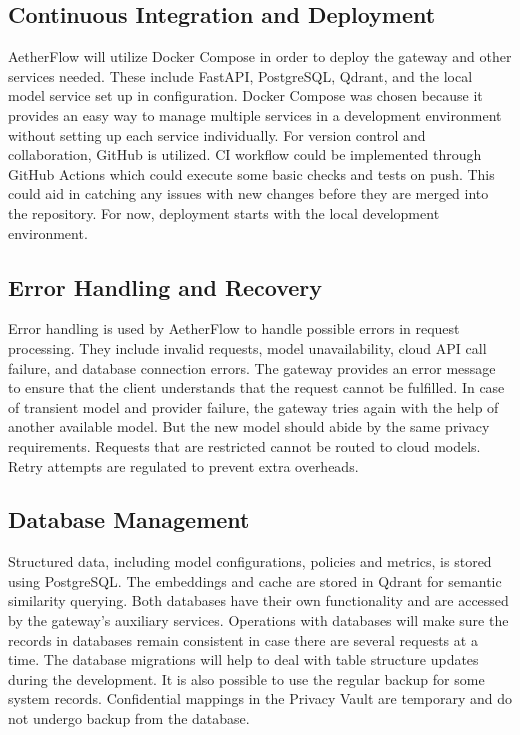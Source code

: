 \documentclass{FastFyp}
\begin{document}
\subsection{Continuous Integration and Deployment}

AetherFlow will utilize Docker Compose in order to deploy the gateway and other services needed. These include FastAPI, PostgreSQL, Qdrant, and the local model service set up in configuration. Docker Compose was chosen because it provides an easy way to manage multiple services in a development environment without setting up each service individually.
For version control and collaboration, GitHub is utilized. CI workflow could be implemented through GitHub Actions which could execute some basic checks and tests on push. This could aid in catching any issues with new changes before they are merged into the repository. For now, deployment starts with the local development environment.

\subsection{Error Handling and Recovery}

Error handling is used by AetherFlow to handle possible errors in request processing. They include invalid requests, model unavailability, cloud API call failure, and database connection errors. The gateway provides an error message to ensure that the client understands that the request cannot be fulfilled.
In case of transient model and provider failure, the gateway tries again with the help of another available model. But the new model should abide by the same privacy requirements. Requests that are restricted cannot be routed to cloud models. Retry attempts are regulated to prevent extra overheads.

\subsection{Database Management}

Structured data, including model configurations, policies and metrics, is stored using PostgreSQL. The embeddings and cache are stored in Qdrant for semantic similarity querying. Both databases have their own functionality and are accessed by the gateway's auxiliary services.
Operations with databases will make sure the records in databases remain consistent in case there are several requests at a time. The database migrations will help to deal with table structure updates during the development. It is also possible to use the regular backup for some system records. Confidential mappings in the Privacy Vault are temporary and do not undergo backup from the database.
\end{document}
